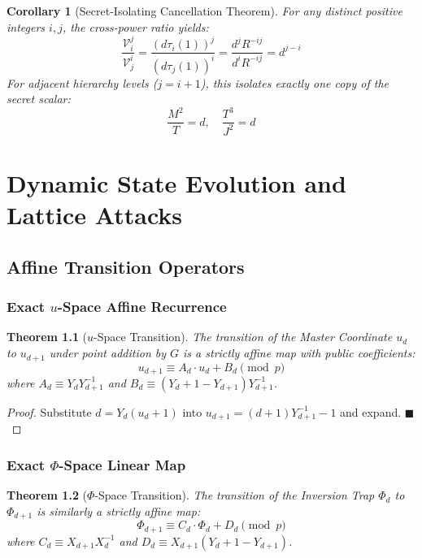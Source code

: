 \documentclass[11pt, a4paper, twoside]{book}
\newtheorem{theorem}{Theorem}[chapter]
\newtheorem{corollary}[theorem]{Corollary}
\begin{document}
\begin{corollary}[Secret-Isolating Cancellation Theorem]
For any distinct positive integers $i, j$, the cross-power ratio yields:
\begin{equation}
    \frac{\mathcal{V}_i^j}{\mathcal{V}_j^i} = \frac{(d \tau_i(1))^j}{(d \tau_j(1))^i} = \frac{d^j R^{-ij}}{d^i R^{-ij}} = d^{j-i}
\end{equation}
For adjacent hierarchy levels ($j = i + 1$), this isolates exactly one copy of the secret scalar:
\begin{equation}
    \frac{M^2}{T} = d, \quad \frac{T^3}{J^2} = d
\end{equation}
\end{corollary}

\part{Dynamic State Evolution and Lattice Attacks}

\chapter{Affine Transition Operators}

\section{Exact $u$-Space Affine Recurrence}
\begin{theorem}[$u$-Space Transition]
The transition of the Master Coordinate $u_d$ to $u_{d+1}$ under point addition by $G$ is a strictly affine map with public coefficients:
\begin{equation}
    u_{d+1} \equiv A_d \cdot u_d + B_d \pmod p
\end{equation}
where $A_d \equiv Y_d Y_{d+1}^{-1}$ and $B_d \equiv (Y_d + 1 - Y_{d+1}) Y_{d+1}^{-1}$.
\end{theorem}
\begin{proof}
Substitute $d = Y_d(u_d + 1)$ into $u_{d+1} = (d+1)Y_{d+1}^{-1} - 1$ and expand. $\blacksquare$
\end{proof}

\section{Exact $\Phi$-Space Linear Map}
\begin{theorem}[$\Phi$-Space Transition]
The transition of the Inversion Trap $\Phi_d$ to $\Phi_{d+1}$ is similarly a strictly affine map:
\begin{equation}
    \Phi_{d+1} \equiv C_d \cdot \Phi_d + D_d \pmod p
\end{equation}
where $C_d \equiv X_{d+1} X_d^{-1}$ and $D_d \equiv X_{d+1}(Y_d + 1 - Y_{d+1})$.
\end{theorem}
\end{document}
